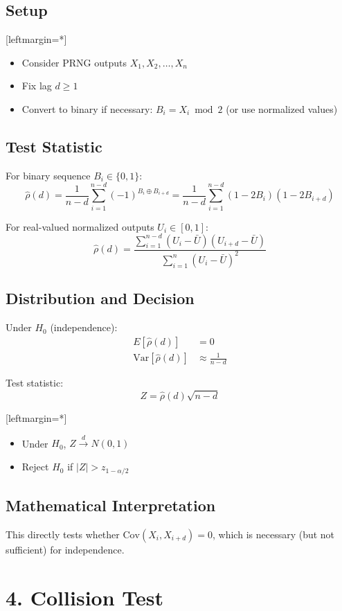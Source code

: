 \documentclass[12pt]{article}
\begin{document}
\subsection*{Setup}
[leftmargin=*]\begin{itemize}
    \item Consider PRNG outputs $X_1, X_2, \dots, X_n$
    \item Fix lag $d \geq 1$
    \item Convert to binary if necessary: $B_i = X_i \bmod 2$ (or use normalized values)
\end{itemize}
\subsection*{Test Statistic}
For binary sequence $B_i \in \{0,1\}$:
\[
\hat{\rho}(d) = \frac{1}{n-d} \sum_{i=1}^{n-d} (-1)^{B_i \oplus B_{i+d}} = \frac{1}{n-d} \sum_{i=1}^{n-d} (1 - 2B_i)(1 - 2B_{i+d})
\]

For real-valued normalized outputs $U_i \in [0,1]$:
\[
\hat{\rho}(d) = \frac{\sum_{i=1}^{n-d} (U_i - \bar{U})(U_{i+d} - \bar{U})}{\sum_{i=1}^{n} (U_i - \bar{U})^2}
\]

\subsection*{Distribution and Decision}
Under $H_0$ (independence):
\begin{align*}
E[\hat{\rho}(d)] &= 0 \\
\text{Var}[\hat{\rho}(d)] &\approx \frac{1}{n-d}
\end{align*}

Test statistic:
\[
Z = \hat{\rho}(d) \sqrt{n-d}
\]

[leftmargin=*] \begin{itemize}
    \item Under $H_0$, $Z \xrightarrow{d} N(0,1)$
    \item Reject $H_0$ if $|Z| > z_{1-\alpha/2}$
\end{itemize}
\subsection*{Mathematical Interpretation}
This directly tests whether $\text{Cov}(X_i, X_{i+d}) = 0$, which is necessary (but not sufficient) for independence.

\section*{4. Collision Test}
\end{document}
